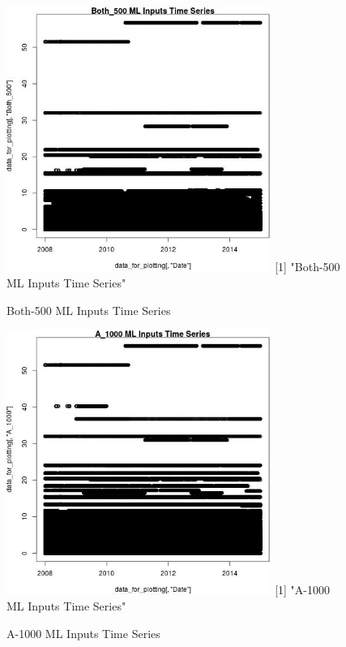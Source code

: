 \begin{figure} 
\centering  
\includegraphics[width=0.77\textwidth]{Code_Outputs/ML_input_report_ML_input_PM25_Step5_part_d_de_duplicated_aves_ML_input_Both_500TS.jpg} 
[1] "Both-500 ML Inputs Time Series"
\caption{\label{fig:ML_input_report_ML_input_PM25_Step5_part_d_de_duplicated_aves_ML_inputBoth_500TS}Both-500 ML Inputs Time Series} 
\end{figure} 
 

\begin{figure} 
\centering  
\includegraphics[width=0.77\textwidth]{Code_Outputs/ML_input_report_ML_input_PM25_Step5_part_d_de_duplicated_aves_ML_input_A_1000TS.jpg} 
[1] "A-1000 ML Inputs Time Series"
\caption{\label{fig:ML_input_report_ML_input_PM25_Step5_part_d_de_duplicated_aves_ML_inputA_1000TS}A-1000 ML Inputs Time Series} 
\end{figure} 
 

